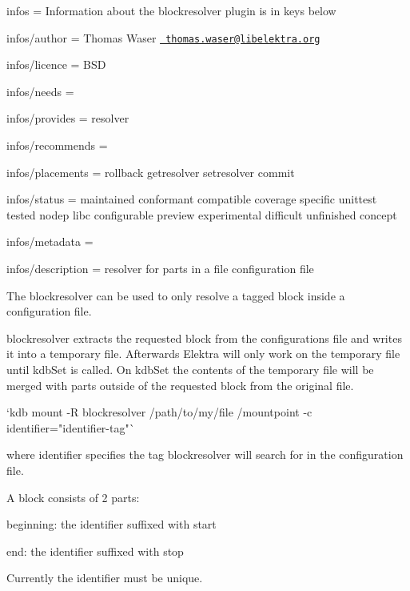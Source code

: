 
\begin{DoxyItemize}
\item infos = Information about the blockresolver plugin is in keys below
\item infos/author = Thomas Waser \href{mailto:thomas.waser@libelektra.org}{\texttt{ thomas.\+waser@libelektra.\+org}}
\item infos/licence = B\+SD
\item infos/needs =
\item infos/provides = resolver
\item infos/recommends =
\item infos/placements = rollback getresolver setresolver commit
\item infos/status = maintained conformant compatible coverage specific unittest tested nodep libc configurable preview experimental difficult unfinished concept
\item infos/metadata =
\item infos/description = resolver for parts in a file configuration file
\end{DoxyItemize}

The {\ttfamily blockresolver} can be used to only resolve a tagged block inside a configuration file.

{\ttfamily blockresolver} extracts the requested block from the configurations file and writes it into a temporary file. Afterwards Elektra will only work on the temporary file until kdb\+Set is called. On kdb\+Set the contents of the temporary file will be merged with parts outside of the requested block from the original file.

\begin{DoxyVerb}`kdb mount -R blockresolver /path/to/my/file /mountpoint -c identifier="identifier-tag"`
\end{DoxyVerb}


where {\ttfamily identifier} specifies the tag {\ttfamily blockresolver} will search for in the configuration file.

A block consists of 2 parts\+:


\begin{DoxyItemize}
\item beginning\+: the identifier suffixed with {\ttfamily start}
\item end\+: the identifier suffixed with {\ttfamily stop}
\end{DoxyItemize}

Currently the identifier must be unique.


